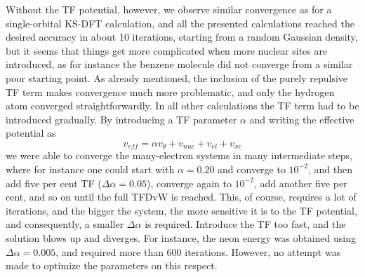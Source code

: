 Without the TF potential, however, we observe similar convergence as for a single-orbital KS-DFT
calculation, and all the presented calculations reached the desired accuracy in about 10 iterations, starting 
from a random Gaussian density, but it seems that things get more complicated when more nuclear sites are 
introduced, as for instance the benzene molecule did not converge from a similar poor starting point. As already
mentioned, the inclusion of the purely repulsive TF term makes convergence much more problematic, and only the 
hydrogen atom converged straightforwardly. In all other calculations the TF term had to be introduced gradually.
By introducing a TF parameter $\alpha$ and writing the effective potential as
\begin{equation}
    v_{eff} = \alpha v_{\theta} + v_{nuc} + v_{el} + v_{xc}
\end{equation}
we were able to converge the many-electron systems in many intermediate steps, where for instance one could start 
with $\alpha=0.20$ and converge to $10^{-2}$, and then add five per cent TF ($\Delta\alpha=0.05$), converge again 
to $10^{-2}$, add another five per cent, and so on until the full TFDvW is reached. This, of course, requires a lot of 
iterations, and the bigger the system, the more sensitive it is to the TF potential, and consequently, a smaller 
$\Delta\alpha$ is required. Introduce the TF too fast, and the solution blows up and diverges. For instance, the neon 
energy was obtained using $\Delta\alpha=0.005$, and required more than 600 iterations. However, no attempt was made 
to optimize the parameters on this respect. 

